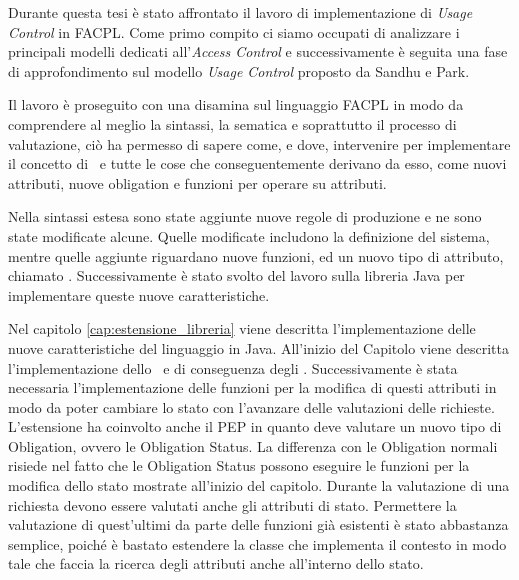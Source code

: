 \label{cap:conclusioni}
Durante questa tesi è stato affrontato il lavoro di implementazione di \textit{Usage Control} in \ac{FACPL}.
Come primo compito ci siamo occupati di analizzare i principali modelli dedicati all'\textit{Access Control} e successivamente è seguita una fase di approfondimento sul modello \textit{Usage Control} proposto da Sandhu e Park.  \par
Il lavoro è proseguito con una disamina sul linguaggio \ac{FACPL} in modo da comprendere al meglio la sintassi, la sematica e soprattutto il processo di valutazione, ciò ha permesso di sapere come, e dove, intervenire per implementare il concetto di \status \ e tutte le cose che conseguentemente  derivano da esso, come nuovi attributi, nuove obligation e funzioni per operare su attributi. \par
Nella sintassi estesa sono state aggiunte nuove regole di produzione e ne sono state modificate alcune. Quelle modificate includono la definizione del sistema, mentre quelle aggiunte riguardano nuove funzioni, ed un nuovo tipo di attributo, chiamato \statusattribute.
Successivamente è stato svolto del lavoro sulla libreria Java per implementare queste nuove caratteristiche. \par
Nel capitolo \ref{cap:estensione_libreria} viene descritta l'implementazione delle nuove caratteristiche del linguaggio in Java. All'inizio del Capitolo viene descritta l'implementazione dello \status \ e di conseguenza degli \statusattribute. Successivamente è stata necessaria  l'implementazione  delle funzioni per la modifica di questi attributi in modo da poter cambiare lo stato con l'avanzare delle valutazioni delle richieste. L'estensione ha coinvolto anche il \ac{PEP} in quanto deve valutare un nuovo tipo di Obligation, ovvero le Obligation Status.
La differenza con le Obligation normali risiede nel fatto che le Obligation Status possono eseguire le funzioni per la modifica dello stato mostrate all'inizio del capitolo.
Durante la valutazione di una richiesta devono essere valutati anche gli attributi di stato. Permettere la valutazione di quest'ultimi da parte delle funzioni già esistenti è stato abbastanza semplice, poiché è bastato estendere la classe che implementa il contesto in modo tale che faccia la ricerca degli attributi anche all'interno dello stato.\par
